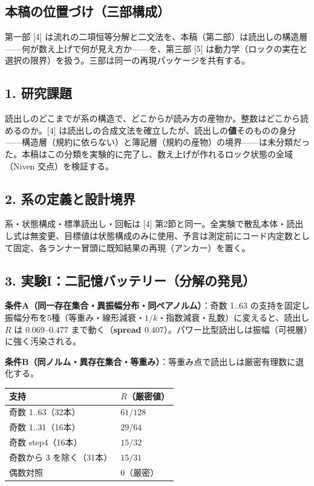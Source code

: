 \documentclass[
  a4paper,
]{ltjsarticle}
\newcounter{none} %
\begin{document}
\subsection{本稿の位置づけ（三部構成）}\label{ux672cux7a3fux306eux4f4dux7f6eux3065ux3051ux4e09ux90e8ux69cbux6210}

第一部 {[}4{]}
は流れの二項恒等分解と二文法を、本稿（第二部）は読出しの構造層------何が数え上げで何が見え方か------を、第三部
{[}5{]}
は動力学（ロックの実在と選択の限界）を扱う。三部は同一の再現パッケージを共有する。

\subsection{1. 研究課題}\label{ux7814ux7a76ux8ab2ux984c}

読出しのどこまでが系の構造で、どこからが読み方の産物か。整数はどこから読めるのか。{[}4{]}
は読出しの合成文法を確立したが、読出しの\textbf{値}そのものの身分------構造層（規約に依らない）と簿記層（規約の産物）の境界------は未分類だった。本稿はこの分類を実験的に完了し、数え上げが作れるロック状態の全域（Niven
交点）を検証する。

\subsection{2.
系の定義と設計境界}\label{ux7cfbux306eux5b9aux7fa9ux3068ux8a2dux8a08ux5883ux754c}

系・状態構成・標準読出し・回転は {[}4{]}
第2節と同一。全実験で散乱本体・読出し式は無変更、目標値は状態構成のみに使用、予言は測定前にコード内定数として固定、各ランナー冒頭に既知結果の再現（アンカー）を置く。

\subsection{3.
実験I：二記憶バッテリー（分解の発見）}\label{ux5b9fux9a13iux4e8cux8a18ux61b6ux30d0ux30c3ux30c6ux30eaux30fcux5206ux89e3ux306eux767aux898b}

\textbf{条件A（同一存在集合・異振幅分布・同ペアノルム）}：奇数 1..63
の支持を固定し振幅分布を5種（等重み・線形減衰・\(1/k\)・指数減衰・乱数）に変えると、読出し
\(R\) は \(0.069\)--\(0.477\) まで動く（\textbf{spread
\(0.407\)}）。パワー比型読出しは振幅（可視層）に強く汚染される。

\textbf{条件B（同ノルム・異存在集合・等重み）}：等重み点で読出しは厳密有理数に退化する。

{\def\LTcaptype{none} %
\begin{longtable}[]{@{}ll@{}}
\toprule\noalign{}
支持 & \(R\)（厳密値） \\
\midrule\noalign{}
\endhead
\bottomrule\noalign{}
\endlastfoot
奇数 1..63（32本） & \(61/128\) \\
奇数 1..31（16本） & \(29/64\) \\
奇数 step4（16本） & \(15/32\) \\
奇数から 3 を除く（31本） & \(15/31\) \\
偶数対照 & \(0\)（厳密） \\
\end{longtable}
}
\end{document}
